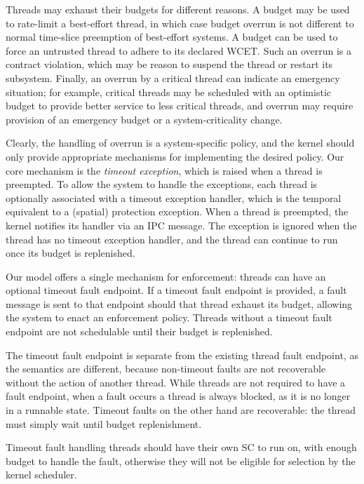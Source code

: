 Threads may exhaust their budgets for different reasons. A budget may
be used to rate-limit a best-effort thread, in which case budget
overrun is not different to normal time-slice preemption of
best-effort systems. A budget can be used to force an untrusted thread
to adhere to its declared WCET. Such an overrun is a contract violation, which may be reason
to suspend the thread or restart its subsystem. Finally, an overrun by
a critical thread can indicate an emergency situation; for example,
critical threads may be scheduled with an optimistic budget to provide
better service to less critical threads, and overrun may require
provision of an emergency budget or a system-criticality change.

Clearly, the handling of overrun is a system-specific policy, and the
kernel should only provide appropriate
mechanisms for implementing the desired policy. Our core mechanism is
the \emph{timeout exception}, which is raised when a thread is
preempted. To allow the system to handle the exceptions, each thread
is optionally associated with a timeout exception handler, which is
the temporal equivalent to a (spatial) protection exception. When a
thread is preempted, the kernel notifies its handler via an IPC message. The
exception is ignored when the thread has no timeout exception handler, and the thread
can continue to run once its budget is replenished.

Our model offers a single mechanism for enforcement: threads can have an optional timeout fault
endpoint.
If a timeout fault endpoint is provided, a fault message is sent to that endpoint should that thread
exhaust its budget, allowing the system to enact an enforcement policy.
Threads without a timeout fault endpoint are not schedulable until their budget is replenished. 

The timeout fault
endpoint is separate from the existing thread fault endpoint, as the semantics are different,
because non-timeout faults are not recoverable without the action of another thread. 
While threads are not required to have a fault endpoint, when a fault occurs a thread is always
blocked, as it is no longer in a runnable state. Timeout faults on the other hand are recoverable:
the thread must simply wait until budget replenishment. 

Timeout fault handling threads should have their own \gls{SC} to run on, with enough budget to handle
the fault, otherwise they will not be eligible for selection by the kernel scheduler.

